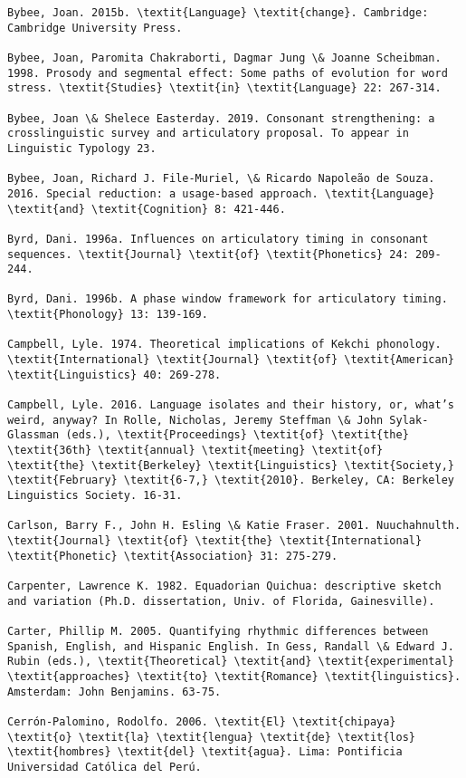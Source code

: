 \begin{verbatim}
Bybee, Joan. 2015b. \textit{Language} \textit{change}. Cambridge: Cambridge University Press.

Bybee, Joan, Paromita Chakraborti, Dagmar Jung \& Joanne Scheibman. 1998. Prosody and segmental effect: Some paths of evolution for word stress. \textit{Studies} \textit{in} \textit{Language} 22: 267-314.

Bybee, Joan \& Shelece Easterday. 2019. Consonant strengthening: a crosslinguistic survey and articulatory proposal. To appear in Linguistic Typology 23.

Bybee, Joan, Richard J. File-Muriel, \& Ricardo Napoleão de Souza. 2016. Special reduction: a usage-based approach. \textit{Language} \textit{and} \textit{Cognition} 8: 421-446.

Byrd, Dani. 1996a. Influences on articulatory timing in consonant sequences. \textit{Journal} \textit{of} \textit{Phonetics} 24: 209-244.

Byrd, Dani. 1996b. A phase window framework for articulatory timing. \textit{Phonology} 13: 139-169.

Campbell, Lyle. 1974. Theoretical implications of Kekchi phonology. \textit{International} \textit{Journal} \textit{of} \textit{American} \textit{Linguistics} 40: 269-278.

Campbell, Lyle. 2016. Language isolates and their history, or, what’s weird, anyway? In Rolle, Nicholas, Jeremy Steffman \& John Sylak-Glassman (eds.), \textit{Proceedings} \textit{of} \textit{the} \textit{36th} \textit{annual} \textit{meeting} \textit{of} \textit{the} \textit{Berkeley} \textit{Linguistics} \textit{Society,} \textit{February} \textit{6-7,} \textit{2010}. Berkeley, CA: Berkeley Linguistics Society. 16-31.

Carlson, Barry F., John H. Esling \& Katie Fraser. 2001. Nuuchahnulth. \textit{Journal} \textit{of} \textit{the} \textit{International} \textit{Phonetic} \textit{Association} 31: 275-279.

Carpenter, Lawrence K. 1982. Equadorian Quichua: descriptive sketch and variation (Ph.D. dissertation, Univ. of Florida, Gainesville).

Carter, Phillip M. 2005. Quantifying rhythmic differences between Spanish, English, and Hispanic English. In Gess, Randall \& Edward J. Rubin (eds.), \textit{Theoretical} \textit{and} \textit{experimental} \textit{approaches} \textit{to} \textit{Romance} \textit{linguistics}. Amsterdam: John Benjamins. 63-75.

Cerrón-Palomino, Rodolfo. 2006. \textit{El} \textit{chipaya} \textit{o} \textit{la} \textit{lengua} \textit{de} \textit{los} \textit{hombres} \textit{del} \textit{agua}. Lima: Pontificia Universidad Católica del Perú.


\end{verbatim}
